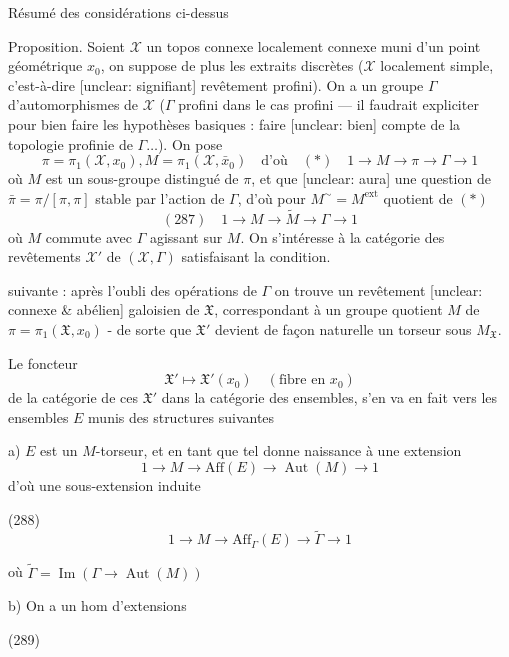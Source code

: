 \newpage


Résumé des considérations ci-dessus

Proposition. Soient $\mathcal{X}$ un topos connexe localement connexe muni d'un point géométrique $x_0$, on suppose de plus les extraits discrètes ($\mathcal{X}$ localement simple, c'est-à-dire [unclear: signifiant] revêtement profini).
On a un groupe $\Gamma$ d'automorphismes de $\mathcal{X}$ ($\Gamma$ profini dans le cas profini — il faudrait expliciter pour bien faire les hypothèses basiques : faire [unclear: bien] compte de la topologie profinie de $\Gamma \dots$). On pose
$$
\pi = \pi_1(\mathcal{X}, x_0), M = \pi_1(\mathcal{X}, \bar{x}_0) \quad \text{d'où} \quad (*) \quad 1 \to M \to \pi \to \Gamma \to 1
$$
où $M$ est un sous-groupe distingué de $\pi$, et que [unclear: aura] une question de $\bar{\pi} = \pi/[\pi, \pi]$ stable par l'action de $\Gamma$, d'où pour $M^{\sim} = M^{\text{ext}}$ quotient de $(*)$
$$
(287) \quad 1 \to M \to \widetilde{M} \to \Gamma \to 1
$$
où $M$ commute avec $\Gamma$ agissant sur $M$.
On s'intéresse à la catégorie des revêtements $\mathcal{X}'$ de $(\mathcal{X}, \Gamma)$ satisfaisant la condition.

\newpage


suivante : après l'oubli des opérations de $\Gamma$ on trouve un revêtement [unclear: connexe & abélien] galoisien de $\mathfrak{X}$, correspondant à un groupe quotient $M$ de $\pi = \pi_1(\mathfrak{X}, x_0)$ - de sorte que $\mathfrak{X}'$ devient de façon naturelle un torseur sous $M_{\mathfrak{X}}$.

Le foncteur
$$ \mathfrak{X}' \longmapsto \mathfrak{X}'(x_0) \quad (\text{fibre en } x_0) $$
de la catégorie de ces $\mathfrak{X}'$ dans la catégorie des ensembles, s'en va en fait vers les ensembles $E$ munis des structures suivantes

a) $E$ est un $M$-torseur, et en tant que tel donne naissance à une extension
$$ 1 \to M \to \text{Aff}(E) \to \operatorname{Aut}(M) \to 1 $$
d'où une sous-extension induite

(288)
$$ 1 \to M \to \text{Aff}_\Gamma(E) \to \tilde{\Gamma} \to 1 $$

où $\tilde{\Gamma} = \operatorname{Im}(\Gamma \to \operatorname{Aut}(M))$

b) On a un hom d'extensions

(289)

